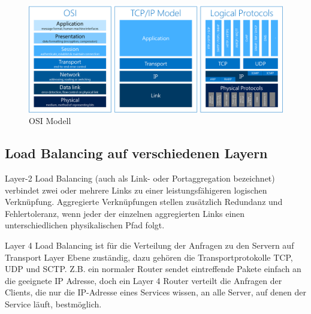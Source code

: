 \begin{figure}[!h]
	\begin{center}
		\includegraphics[width=0.8\linewidth]{images/loadbalancing3.jpg}
		\caption{OSI Modell \cite{LoadBalancingGrafik2}}
		\label{OSI Modell}
	\end{center}
\end{figure}

\subsection{Load Balancing auf verschiedenen Layern}
\label{sec:Load Balancing auf verschiedenen Layern}
Layer-2 Load Balancing (auch als Link- oder Portaggregation bezeichnet) verbindet zwei oder mehrere Links zu einer leistungsfähigeren logischen Verknüpfung. Aggregierte Verknüpfungen stellen zusätzlich Redundanz und Fehlertoleranz, wenn jeder der einzelnen aggregierten Links einen unterschiedlichen physikalischen Pfad folgt.

Layer 4 Load Balancing ist für die Verteilung der Anfragen zu den Servern auf Transport Layer Ebene zuständig, dazu gehören die Transportprotokolle TCP, UDP und SCTP. Z.B. ein normaler Router sendet eintreffende Pakete einfach an die geeignete IP Adresse, doch ein Layer 4 Router verteilt die Anfragen der Clients, die nur die IP-Adresse eines Services wissen, an alle Server,  auf denen der Service läuft, bestmöglich. 

